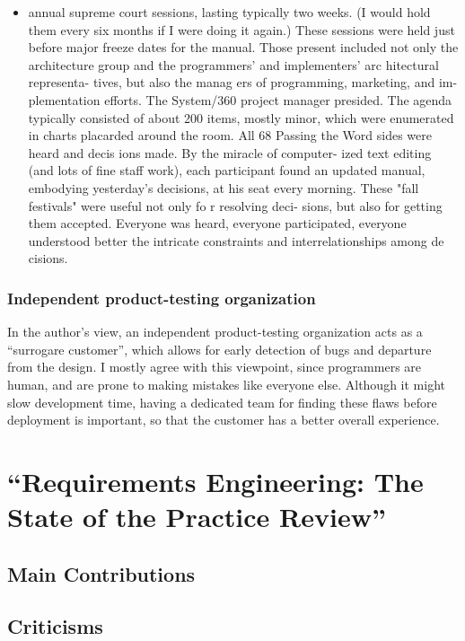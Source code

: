 \documentclass[letterpaper,12pt]{article}
\begin{document}
\begin{itemize}
 \item annual supreme court sessions, lasting typically two weeks. (I would hold
       them every six months if I were doing it again.) These sessions were held just
       before major freeze dates for the manual. Those present included not only the
       architecture group and the programmers' and implementers' arc hitectural
       representa- tives, but also the manag ers of programming, marketing, and im-
       plementation efforts. The System/360 project manager presided. The agenda
       typically consisted of about 200 items, mostly minor, which were enumerated in
       charts placarded around the room. All 68 Passing  the  Word sides were heard
       and decis ions made. By the miracle of computer- ized  text editing  (and lots
       of  fine staff work), each  participant found an updated manual, embodying
       yesterday's decisions, at his seat every  morning. These  "fall festivals" were
       useful not only fo r resolving deci- sions, but  also  for getting  them
       accepted. Everyone  was  heard, everyone participated, everyone understood
       better  the intricate constraints  and  interrelationships  among  de cisions.

\end{itemize}
\subsubsection{Independent product-testing organization}

In the author's view, an independent product-testing organization acts  as a
``surrogare customer'', which allows for early detection of bugs and departure
from the design. I mostly agree with this viewpoint, since programmers are
human, and are prone to making mistakes like everyone else. Although it might
slow development time, having a dedicated team for finding these flaws  before
deployment is important, so that the customer has a better overall experience.

\section{``Requirements Engineering: The State of the Practice Review''}

\subsection{Main Contributions}
\lipsum[3]

\subsection{Criticisms}
\lipsum[4]
\end{document}
